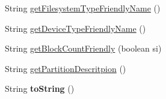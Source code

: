 \begin{DoxyCompactItemize}
\item 
String \hyperlink{class_c_a_s_u_a_l_1_1archiving_1_1libpit_1_1_pit_entry_adb21af84eb8c643ff7fdef92c9d95c12}{get\-Filesystem\-Type\-Friendly\-Name} ()
\item 
String \hyperlink{class_c_a_s_u_a_l_1_1archiving_1_1libpit_1_1_pit_entry_abaac8bab08ad261006d7638510ac45fa}{get\-Device\-Type\-Friendly\-Name} ()
\item 
String \hyperlink{class_c_a_s_u_a_l_1_1archiving_1_1libpit_1_1_pit_entry_a67803574102dff7d60a87cb785eb327d}{get\-Block\-Count\-Friendly} (boolean si)
\item 
String \hyperlink{class_c_a_s_u_a_l_1_1archiving_1_1libpit_1_1_pit_entry_a0c1f5626ed15b63632a25b7107790442}{get\-Partition\-Descritpion} ()
\item 
\hypertarget{class_c_a_s_u_a_l_1_1archiving_1_1libpit_1_1_pit_entry_afc3393197ca61b33f848473150b26221}{String {\bfseries to\-String} ()}\label{class_c_a_s_u_a_l_1_1archiving_1_1libpit_1_1_pit_entry_afc3393197ca61b33f848473150b26221}


\end{DoxyCompactItemize}
